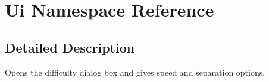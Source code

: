 \hypertarget{namespace_ui}{}\section{Ui Namespace Reference}
\label{namespace_ui}


\subsection{Detailed Description}
Opens the difficulty dialog box and gives speed and separation options. 
